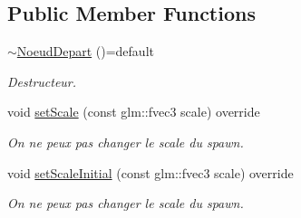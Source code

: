 \subsection*{Public Member Functions}
\begin{DoxyCompactItemize}
\item 
\hypertarget{class_noeud_depart_a6a1abd18717d2072edebff29d5d21995}{}\hyperlink{class_noeud_depart_a6a1abd18717d2072edebff29d5d21995}{$\sim$\+Noeud\+Depart} ()=default\label{class_noeud_depart_a6a1abd18717d2072edebff29d5d21995}

\begin{DoxyCompactList}\small\item\em Destructeur. \end{DoxyCompactList}\item 
\hypertarget{class_noeud_depart_ac02ac846dec4dd15b5ac2656c0907134}{}void \hyperlink{class_noeud_depart_ac02ac846dec4dd15b5ac2656c0907134}{set\+Scale} (const glm\+::fvec3 scale) override\label{class_noeud_depart_ac02ac846dec4dd15b5ac2656c0907134}

\begin{DoxyCompactList}\small\item\em On ne peux pas changer le scale du spawn. \end{DoxyCompactList}\item 
\hypertarget{class_noeud_depart_ac2889c3bb1f8f3d373261a93ea455f70}{}void \hyperlink{class_noeud_depart_ac2889c3bb1f8f3d373261a93ea455f70}{set\+Scale\+Initial} (const glm\+::fvec3 scale) override\label{class_noeud_depart_ac2889c3bb1f8f3d373261a93ea455f70}

\begin{DoxyCompactList}\small\item\em On ne peux pas changer le scale du spawn. \end{DoxyCompactList}\end{DoxyCompactItemize}
{\bf }\par
